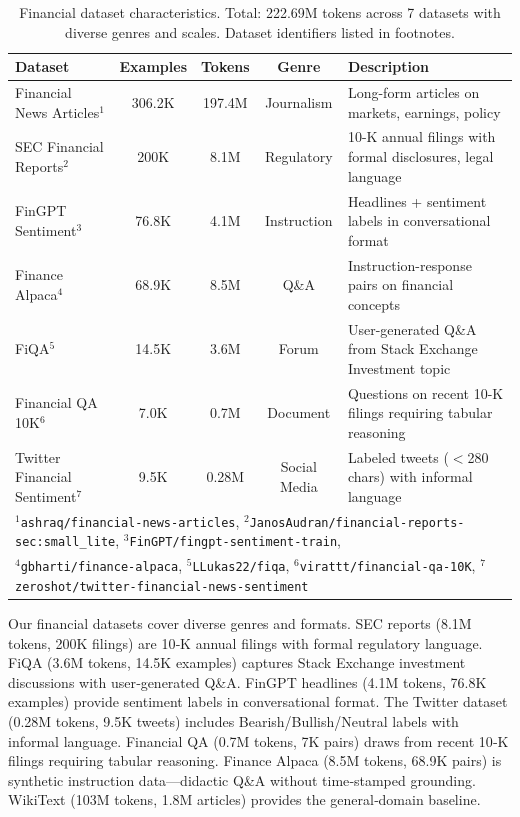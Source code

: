 \begin{table}[h]
\centering
\caption[Financial Dataset Characteristics]{Financial dataset characteristics. Total: 222.69M tokens across 7 datasets with diverse genres and scales. Dataset identifiers listed in footnotes.}
\label{tab:financial_datasets}
\small
\begin{tabular}{p{3.4cm}cccp{5.5cm}}
\toprule
\textbf{Dataset} & \textbf{Examples} & \textbf{Tokens} & \textbf{Genre} & \textbf{Description} \\
\midrule
Financial News Articles$^1$ & 306.2K & 197.4M & Journalism & Long-form articles on markets, earnings, policy \\
\midrule
SEC Financial Reports$^2$ & 200K & 8.1M & Regulatory & 10-K annual filings with formal disclosures, legal language \\
\midrule
FinGPT Sentiment$^3$ & 76.8K & 4.1M & Instruction & Headlines + sentiment labels in conversational format \\
\midrule
Finance Alpaca$^4$ & 68.9K & 8.5M & Q\&A & Instruction-response pairs on financial concepts \\
\midrule
FiQA$^5$ & 14.5K & 3.6M & Forum & User-generated Q\&A from Stack Exchange Investment topic \\
\midrule
Financial QA 10K$^6$ & 7.0K & 0.7M & Document & Questions on recent 10-K filings requiring tabular reasoning \\
\midrule
Twitter Financial Sentiment$^7$ & 9.5K & 0.28M & Social Media & Labeled tweets ($<$280 chars) with informal language \\
\bottomrule
\multicolumn{5}{l}{\footnotesize $^1$\texttt{ashraq/financial-news-articles}, $^2$\texttt{JanosAudran/financial-reports-sec:small\_lite}, $^3$\texttt{FinGPT/fingpt-sentiment-train},} \\
\multicolumn{5}{l}{\footnotesize $^4$\texttt{gbharti/finance-alpaca}, $^5$\texttt{LLukas22/fiqa}, $^6$\texttt{virattt/financial-qa-10K}, $^7$\texttt{zeroshot/twitter-financial-news-sentiment}}
\end{tabular}
\end{table}

Our financial datasets cover diverse genres and formats. SEC reports (8.1M tokens, 200K filings) are 10‑K annual filings with formal regulatory language. FiQA (3.6M tokens, 14.5K examples) captures Stack Exchange investment discussions with user‑generated Q\&A. FinGPT headlines (4.1M tokens, 76.8K examples) provide sentiment labels in conversational format. The Twitter dataset (0.28M tokens, 9.5K tweets) includes Bearish/Bullish/Neutral labels with informal language. Financial QA (0.7M tokens, 7K pairs) draws from recent 10‑K filings requiring tabular reasoning. Finance Alpaca (8.5M tokens, 68.9K pairs) is synthetic instruction data—didactic Q\&A without time‑stamped grounding. WikiText (103M tokens, 1.8M articles) provides the general‑domain baseline.

